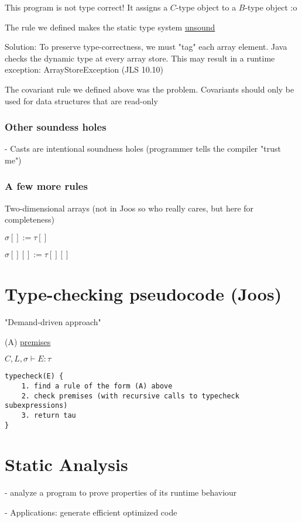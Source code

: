 \documentclass[12pt]{article}
\begin{document}
This program is not type correct! It assigns a $C$-type object to a $B$-type object :o

The rule we defined makes the static type system \underline{unsound}
\newline

Solution: To preserve type-correctness, we must "tag" each array element. Java checks the dynamic type at every array store. This may result in a runtime exception: ArrayStoreException (JLS 10.10)
\newline

The covariant rule we defined above was the problem. Covariants should only be used for data structures that are read-only

\subsubsection{Other soundess holes}

- Casts are intentional soundness holes (programmer tells the compiler "trust me")

\subsubsection{A few more rules}

Two-dimensional arrays (not in Joos so who really cares, but here for completeness)

$\sigma[] := \tau[]$

$\sigma[][] := \tau[][]$

\section{Type-checking pseudocode (Joos)}

"Demand-driven approach"
\newline

(A)
\underline{premises}
	
	$C,L,\sigma \vdash E : \tau$

\begin{verbatim}
typecheck(E) {
	1. find a rule of the form (A) above
	2. check premises (with recursive calls to typecheck subexpressions)
	3. return tau
}
\end{verbatim}

\section{Static Analysis}

- analyze a program to prove properties of its runtime behaviour

- Applications: generate efficient optimized code

\newpage
\end{document}
